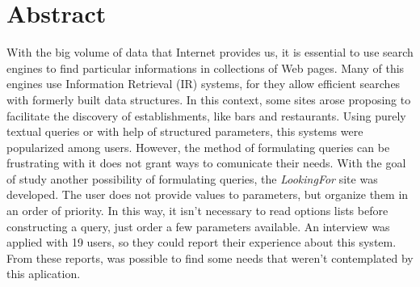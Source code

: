 \documentclass[11pt,oneside,a4paper]{book}
\begin{document}

 \chapter*{Abstract}

With the big volume of data that Internet provides us, it is essential to use search engines to find particular informations in collections of Web pages. Many of this engines use Information Retrieval (IR) systems, for they allow efficient searches with formerly built data structures. In this context, some sites arose proposing to facilitate the discovery of establishments, like bars and restaurants. Using purely textual queries or with help of structured parameters, this systems were popularized among users. However, the method of formulating queries can be frustrating with it does not grant ways to comunicate their needs. With the goal of study another possibility of formulating queries, the \emph{LookingFor} site was developed. The user does not provide values to parameters, but organize them in an order of priority. In this way, it isn’t necessary to read options lists before constructing a query, just order a few parameters available. An interview was applied with 19 users, so they could report their experience about this system. From these reports, was possible to find some needs that weren’t contemplated by this aplication. \\


\tableofcontents    %

\end{document}
